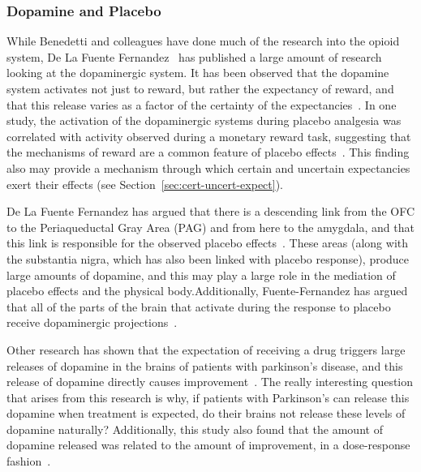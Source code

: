 
\subsubsection{Dopamine and Placebo}
\label{sec:dopamine-placebo}

While Benedetti and colleagues have done much of the research into the opioid system, De La Fuente Fernandez~\cite{DeLaFuente-Fernandez2002} has published a large amount of research looking at the dopaminergic system. It has been observed that the dopamine system activates not just to reward, but rather the expectancy of reward, and that this release varies as a factor of the certainty of the expectancies~\cite{Scott2007}. In one study, the activation of the dopaminergic systems during placebo analgesia was correlated with activity observed during a monetary reward task, suggesting that the mechanisms of reward are a common feature of placebo effects~\cite{Scott2007a}. This finding also may provide a mechanism through which certain and uncertain expectancies exert their effects (see Section~\ref{sec:cert-uncert-expect}).   

De La Fuente Fernandez has argued that there is a descending link from the OFC to the Periaqueductal Gray Area (PAG) and from here to the amygdala, and that this link is responsible for the observed placebo effects~\cite{Fuente-Fernandez2002}. These areas (along with the substantia nigra, which has also been linked with placebo response), produce large amounts of dopamine, and this may play a large role in the mediation of placebo effects and the physical body.Additionally, Fuente-Fernandez has argued that all of the parts of the brain that activate during the response to placebo receive dopaminergic projections~\cite{Fuente-Fernandez2002}.  

Other research has shown that the expectation of receiving a drug triggers large releases of dopamine in the brains of patients with parkinson's disease, and this release of dopamine directly causes improvement~\cite{Pollo2002}. The really interesting question that arises from this research is why, if patients with Parkinson's can release this dopamine when treatment is expected, do their brains not release these levels of dopamine naturally? Additionally, this study also found that the amount of dopamine released was related to the amount of improvement, in a dose-response fashion~\cite{Fuente-Fernandez2002}. 

